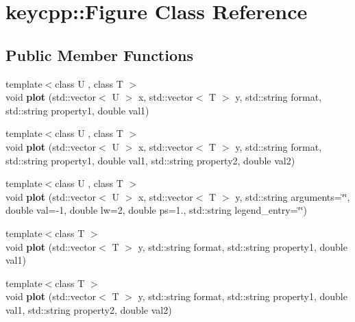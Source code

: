 \hypertarget{classkeycpp_1_1_figure}{\section{keycpp\-:\-:Figure Class Reference}
\label{classkeycpp_1_1_figure}
}
\subsection*{Public Member Functions}
\begin{DoxyCompactItemize}
\item 
\hypertarget{classkeycpp_1_1_figure_a6d2444603362a7782232662410b364aa}{{\footnotesize template$<$class U , class T $>$ }\\void {\bfseries plot} (std\-::vector$<$ U $>$ x, std\-::vector$<$ T $>$ y, std\-::string format, std\-::string property1, double val1)}\label{classkeycpp_1_1_figure_a6d2444603362a7782232662410b364aa}

\item 
\hypertarget{classkeycpp_1_1_figure_aa5761ef52842e596dca311c43920b7a0}{{\footnotesize template$<$class U , class T $>$ }\\void {\bfseries plot} (std\-::vector$<$ U $>$ x, std\-::vector$<$ T $>$ y, std\-::string format, std\-::string property1, double val1, std\-::string property2, double val2)}\label{classkeycpp_1_1_figure_aa5761ef52842e596dca311c43920b7a0}

\item 
\hypertarget{classkeycpp_1_1_figure_aa057f62607febd829d3e1a54801473f8}{{\footnotesize template$<$class U , class T $>$ }\\void {\bfseries plot} (std\-::vector$<$ U $>$ x, std\-::vector$<$ T $>$ y, std\-::string arguments=\char`\"{}\char`\"{}, double val=-\/1, double lw=2, double ps=1., std\-::string legend\-\_\-entry=\char`\"{}\char`\"{})}\label{classkeycpp_1_1_figure_aa057f62607febd829d3e1a54801473f8}

\item 
\hypertarget{classkeycpp_1_1_figure_a21fc5536de2cdaf6272525a28f9e4072}{{\footnotesize template$<$class T $>$ }\\void {\bfseries plot} (std\-::vector$<$ T $>$ y, std\-::string format, std\-::string property1, double val1)}\label{classkeycpp_1_1_figure_a21fc5536de2cdaf6272525a28f9e4072}

\item 
\hypertarget{classkeycpp_1_1_figure_a2c0f7d871472571200258a5c9b95474e}{{\footnotesize template$<$class T $>$ }\\void {\bfseries plot} (std\-::vector$<$ T $>$ y, std\-::string format, std\-::string property1, double val1, std\-::string property2, double val2)}\label{classkeycpp_1_1_figure_a2c0f7d871472571200258a5c9b95474e}


\end{DoxyCompactItemize}
